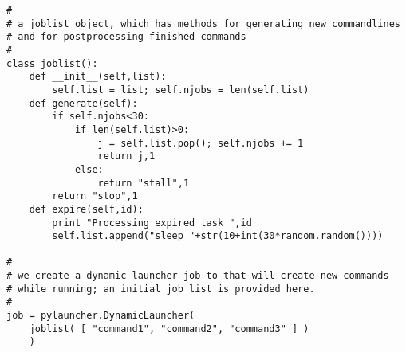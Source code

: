 \documentclass[11pt]{artikel3}
\begin{document}
\begin{verbatim}
#
# a joblist object, which has methods for generating new commandlines
# and for postprocessing finished commands
#
class joblist():
    def __init__(self,list):
        self.list = list; self.njobs = len(self.list)
    def generate(self):
        if self.njobs<30:
            if len(self.list)>0:
                j = self.list.pop(); self.njobs += 1
                return j,1
            else:
                return "stall",1
        return "stop",1
    def expire(self,id):
        print "Processing expired task ",id
        self.list.append("sleep "+str(10+int(30*random.random())))

#
# we create a dynamic launcher job to that will create new commands
# while running; an initial job list is provided here.
#
job = pylauncher.DynamicLauncher(
    joblist( [ "command1", "command2", "command3" ] )
    )
\end{verbatim}
\end{document}
